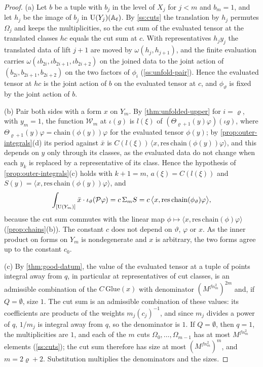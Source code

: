 \begin{proof}
(a) Let $b$ be a tuple with $b_j$ in the level of $X_j$ for $j<m$ and $b_m=1$, and let $h_j$ be the image of $b_j$ in $\operatorname{U}(Y_j)(\mathbb{A}_{\mathrm f})$. By \cref{ss:cuts} the translation by $h_j$ permutes $\Omega_j$ and keeps the multiplicities, so the cut sum of the evaluated tensor at the translated classes $hc$ equals the cut sum at $c$. With
representatives $h_jy_j$ the translated data of lift $j+1$ are moved by $\omega(h_j,h_{j+1})$, and the finite evaluation carries $\omega(\iota b_{2i},\iota b_{2i+1},\iota b_{2i+2})$ on the joined data to the joint action of $(b_{2i},b_{2i+1},b_{2i+2})$ on the two factors of $\phi_i$ (\cref{ss:unfold-pair}). Hence the evaluated tensor at $hc$ is
the joint action of $b$ on the evaluated tensor at $c$, and $\phi_\vartheta$ is fixed by the joint action of $b$.

(b) Pair both sides with a form $x$ on $Y_m$. By \cref{thm:unfolded-upper} for $i=\varrho$, with $y_m=1$, the function $\mathcal W_m$ at $\iota(g)$ is $l(\xi)$ of $(\Theta_{\varrho+1}(y)\varphi)(\iota g)$, where $\Theta_{\varrho+1}(y)\varphi=\mathrm{chain}(\phi(y))\varphi$ for the evaluated tensor $\phi(y)$; by
\cref{prop:outer-integrals}(d) its period against $\bar x$ is $C(l(\xi))\,\langle x,\mathrm{res}\,\mathrm{chain}(\phi(y))\varphi\rangle$, and this depends on $y$ only through its classes, as the evaluated data do not change when each $y_k$ is replaced by a representative of its class. Hence the hypothesis of \cref{prop:outer-integrals}(c) holds with $k+1=m$,
$a(\xi)=C(l(\xi))$ and $S(y)=\langle x,\mathrm{res}\,\mathrm{chain}(\phi(y))\varphi\rangle$, and
\[
  \int_{[\operatorname{U}(Y_m)]}\bar x\cdot\iota_\vartheta(\mathcal P\varphi)=c\,\Sigma_mS=c\,\bigl\langle x,\mathrm{res}\,\mathrm{chain}(\phi_\vartheta)\varphi\bigr\rangle ,
\]
because the cut sum commutes with the linear map $\phi\mapsto\langle x,\mathrm{res}\,\mathrm{chain}(\phi)\varphi\rangle$ (\cref{prop:chains}(b)). The constant $c$ does not depend on $\vartheta$, $\varphi$ or $x$. As the inner product on forms on $Y_m$ is nondegenerate and $x$ is arbitrary, the two forms agree up to the constant $c_0$.

(c) By \cref{thm:good-datum}, the value of the evaluated tensor at a tuple of points integral away from $q$, in particular at representatives of cut classes, is an admissible combination of the $C\,\mathrm{Glue}(x)$ with denominator $(M^{fn_m^2})^{2m}$ and, if $Q=\emptyset$, size $1$. The cut sum is an admissible combination of these values: its
coefficients are products of the weights $m_j(c_j)^{-1}$, and since $m_j$ divides a power of $q$, $1/m_j$ is integral away from $q$, so the denominator is $1$. If $Q=\emptyset$, then $q=1$, the multiplicities are $1$, and each of the $m$ cuts $\Omega_0,\dots,\Omega_{m-1}$ has at most $M^{fn_m^2}$ elements (\cref{ss:cuts}); the cut sum
therefore has size at most $(M^{fn_m^2})^m$, and $m=2\varrho+2$. Substitution multiplies the denominators and the sizes.
\end{proof}

